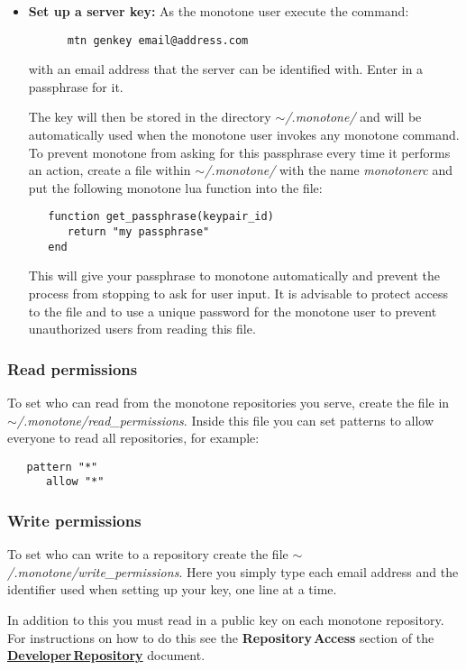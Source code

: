 \documentclass[12pt]{article}
\begin{document}
\begin{itemize}
   \item[]{\bf Set up a server key:} As the monotone user execute the command:
   \begin{verbatim}
      mtn genkey email@address.com
   \end{verbatim}
with an email address that the server can be identified with. Enter in a passphrase for it.

The key will then be stored in the directory {\it $\sim$/.monotone/}
and will be automatically used when the monotone user invokes any
monotone command. To prevent monotone from asking for this passphrase
every time it performs an action, create a file within {\it
  $\sim$/.monotone/} with the name {\it monotonerc} and put the
following monotone lua function into the file:
\begin{verbatim}
   function get_passphrase(keypair_id)
      return "my passphrase"
   end
\end{verbatim}
This will give your passphrase to monotone automatically and prevent
the process from stopping to ask for user input. It is advisable to
protect access to the file and to use a unique password for the
monotone user to prevent unauthorized users from reading this file.
\end{itemize}

\subsubsection*{Read permissions}

To set who can read from the monotone repositories you serve, create the file in {\it $\sim$/.monotone/read\_permissions}. Inside this file you can set patterns to allow everyone to read all repositories, for example:
\begin{verbatim}
   pattern "*"
      allow "*"
\end{verbatim}

\subsubsection*{Write permissions}

To set who can write to a repository create the file {\it $\sim$/.monotone/write\_permissions}. Here you simply type each email address and the identifier used when setting up your key, one line at a time.

In addition to this you must read in a public key on each monotone repository. For instructions on how to do this see the {\bf Repository\,Access} section of the \href{../developer-repository/developer-repository.tex}{\bf Developer\,Repository} document.
\end{document}
